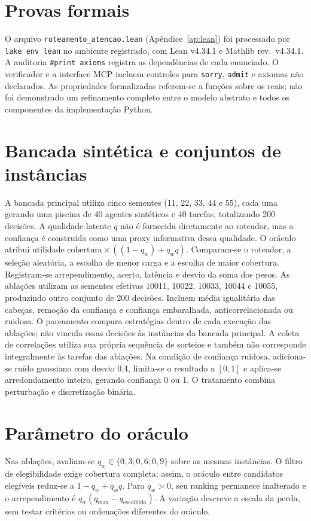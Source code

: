 \documentclass[12pt,openany,oneside,a4paper,brazil,chapter=TITLE]{abntex2}
\begin{document}
\section{Provas formais}
O arquivo \texttt{roteamento\_atencao.lean} (Apêndice~\ref{ap:lean}) foi processado por \texttt{lake env lean} no ambiente registrado, com Lean v4.34.1 e Mathlib rev.\ v4.34.1. A auditoria \texttt{\#print axioms} registra as dependências de cada enunciado. O verificador e a interface MCP incluem controles para \texttt{sorry}, \texttt{admit} e axiomas não declarados. As propriedades formalizadas referem-se a funções sobre os reais; não foi demonstrado um refinamento completo entre o modelo abstrato e todos os componentes da implementação Python.
\section{Bancada sintética e conjuntos de instâncias}
A bancada principal utiliza cinco sementes (11, 22, 33, 44 e 55), cada uma gerando uma piscina de 40 agentes sintéticos e 40 tarefas, totalizando 200 decisões. A qualidade latente $q$ não é fornecida diretamente ao roteador, mas a confiança é construída como uma proxy informativa dessa qualidade. O oráculo atribui utilidade $\mathrm{cobertura}\times((1-q_w)+q_wq)$. Comparam-se o roteador, a seleção aleatória, a escolha de menor carga e a escolha de maior cobertura. Registram-se arrependimento, acerto, latência e desvio da soma dos pesos.
As ablações utilizam as sementes efetivas 10011, 10022, 10033, 10044 e 10055, produzindo outro conjunto de 200 decisões. Incluem média igualitária das cabeças, remoção da confiança e confiança embaralhada, anticorrelacionada ou ruidosa. O pareamento compara estratégias dentro de cada execução das ablações; não vincula essas decisões às instâncias da bancada principal. A coleta de correlações utiliza sua própria sequência de sorteios e também não corresponde integralmente às tarefas das ablações.
Na condição de confiança ruidosa, adiciona-se ruído gaussiano com desvio 0,4, limita-se o resultado a $[0,1]$ e aplica-se arredondamento inteiro, gerando confiança 0 ou 1. O tratamento combina perturbação e discretização binária.
\section{Parâmetro do oráculo}
Nas ablações, avaliam-se $q_w\in\{0{,}3;0{,}6;0{,}9\}$ sobre as mesmas instâncias. O filtro de elegibilidade exige cobertura completa; assim, o oráculo entre candidatos elegíveis reduz-se a $1-q_w+q_wq$. Para $q_w>0$, seu ranking permanece inalterado e o arrependimento é $q_w(q_{\max}-q_{\mathrm{escolhido}})$. A variação descreve a escala da perda, sem testar critérios ou ordenações diferentes do oráculo.
\end{document}
